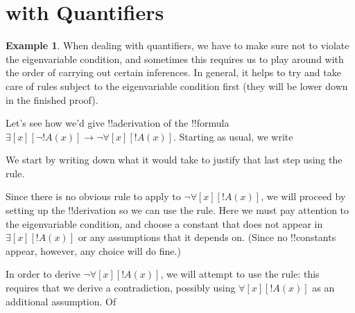 \documentclass[10pt,a4paper]{article}
\theoremstyle{plain}
\theoremstyle{definition}
\newtheorem{ex}[thm]{Example}
\theoremstyle{remark}
\newcommand*{\olfileid}[3]{}
\newcommand*{\olsection}[1]{\section*{#1}}
\providecommand{\AxiomC}[1]{}
\providecommand{\UnaryInfC}[1]{}
\providecommand{\BinaryInfC}[1]{}
\newenvironment{prooftree}{}{}
\providecommand{\lif}{\mathbin{\rightarrow}}
\providecommand{\lforall}{\mathord{\forall}}
\providecommand{\lexists}{\mathord{\exists}}
\providecommand{\Elim}[1]{}
\providecommand{\Intro}[1]{}
\providecommand{\Discharge}{\mathrm{Dis}}
\providecommand{\Intro}{\mathrm{I}}
\providecommand{\DischargeRule}{\mathrm{Dis}}
\providecommand{\DischargeRule}{\mathrm{Dis}}
\begin{document}



\olfileid{fol}{ntd}{prq}

\olsection{ with Quantifiers}

\begin{ex}
When dealing with quantifiers, we have to make sure not to violate the
eigenvariable condition, and sometimes this requires us to play around
with the order of carrying out certain inferences. In general, it
helps to try and take care of rules subject to the eigenvariable
condition first (they will be lower down in the finished proof).

Let's see how we'd give !!a{derivation} of the !!{formula}
$\lexists[x][\lnot !A(x)] \lif \lnot \lforall[x][!A(x)]$.
Starting as usual, we write
\begin{prooftree}
\AxiomC{}
\UnaryInfC{$\lexists[x][\lnot !A(x)]\lif \lnot \lforall[x][!A(x)]$}
\end{prooftree}
We start by writing down what it would take to justify that last step
using the \Intro{\lif} rule.
\begin{prooftree}
\AxiomC{$\Discharge{\lexists[x][\lnot !A(x)]}{1}$}
\DeduceC{$\lnot \lforall[x][!A(x)]$}
\DischargeRule{\Intro{\lif}}{1}
\UnaryInfC{$\lexists[x][\lnot !A(x)]\lif \lnot \lforall[x][!A(x)]$}
\end{prooftree}
Since there is no obvious rule to apply to $\lnot \lforall[x][!A(x)]$,
we will proceed by setting up the !!{derivation} so we can use the
\Elim{\lexists} rule. Here we must pay attention to the eigenvariable
condition, and choose a constant that does not appear in
$\lexists[x][!A(x)]$ or any assumptions that it depends on.
(Since no !!{constant}s appear, however, any choice will do fine.)
\begin{prooftree}
\AxiomC{$\Discharge{\lexists[x][\lnot !A(x)]}{1}$}
\AxiomC{$\Discharge{\lnot !A(a)}{2}$}
\DeduceC{$\lnot \lforall[x][!A(x)]$}
\DischargeRule{\Elim{\lexists}}{2}
\BinaryInfC{$\lnot \lforall[x][!A(x)]$}
\DischargeRule{\Intro{\lif}}{1}
\UnaryInfC{$\lexists[x][\lnot !A(x)] \lif \lnot \lforall[x][!A(x)]$}
\end{prooftree}
In order to derive $\lnot \lforall[x][!A(x)]$, we will attempt to use
the \Intro{\lnot} rule: this requires that we derive a contradiction,
possibly using $\lforall[x][!A(x)]$ as an additional assumption. Of

\end{ex}
\end{document}
